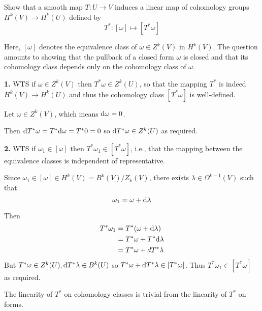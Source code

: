 \documentclass[a4paper, 12pt]{article}
\begin{document}
\begin{problem} 
Show that a smooth map $T: U \to V$ induces a linear map of cohomology groups $H^k (V) \to H^k (U)$ defined by \[
 T^*: [\omega] \mapsto [T^* \omega]
 \]

Here, $[\omega]$ denotes the equivalence class of $\omega \in Z^k (V)$ in $H^k(V)$. The question amounts to showing that the pullback of a closed form $\omega$ is closed and that its cohomology class depends only on the cohomology class of $\omega$.
\end{problem}
\begin{solution}
    \textbf{1.} WTS if $\omega \in Z^k(V)$ then $T^* \omega \in Z^k(U)$, so that the mapping $T^*$ is indeed $H^k(V) \to H^k(U)$ and thus the cohomology class $[T^* \omega]$ is well-defined.

    Let $\omega \in Z^k(V)$, which means $\mathrm{d} \omega = 0$.

    Then $\mathrm{d} T^* \omega = T^* \mathrm{d} \omega = T^* 0 = 0$ so $\mathrm{d} T^* \omega \in Z^k(U)$ as required.

    \textbf{2.} WTS if $\omega_1 \in [\omega]$ then $T^* \omega_1 \in [T^* \omega]$, i.e., that the mapping between the equivalence classes is independent of representative.

    Since $\omega_1 \in [\omega] \in H^k(V) = B^k(V)/Z_k(V)$, there exists $\lambda \in \Omega^{k-1} (V)$ such that \begin{equation*}
    \omega_1 = \omega + \mathrm{d} \lambda
    \end{equation*}

    Then \begin{align*}
        T^* \omega_1 &= T^* (\omega + \mathrm{d} \lambda) \\
        &= T^* \omega + T^* \mathrm{d} \lambda \\
        &= T^* \omega + d T^* \lambda
    \end{align*}
    But $T^* \omega \in Z^k(U), \mathrm{d} T^* \lambda \in B^k(U)$ so $T^* \omega + \mathrm{d} T^* \lambda \in [T^* \omega]$. Thus $T^* \omega_1 \in [T^* \omega]$ as required.
    
    The linearity of $T^*$ on cohomology classes is trivial from the linearity of $T^*$ on forms.
\end{solution}
\end{document}
